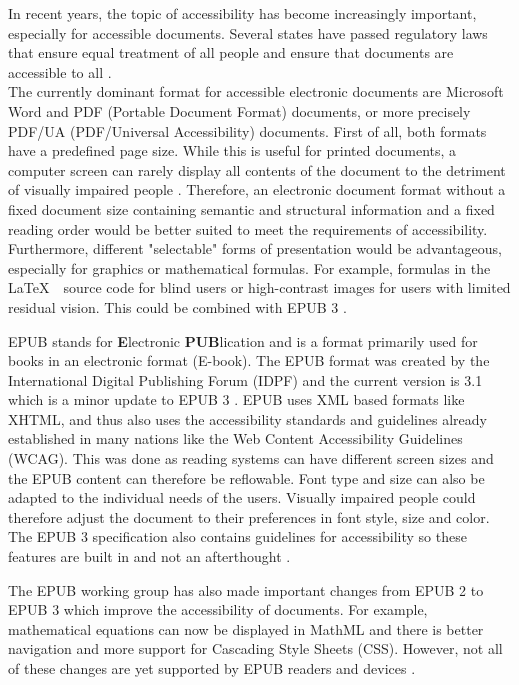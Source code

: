 In recent years, the topic of accessibility has become increasingly important, especially for accessible documents. Several states have passed regulatory laws that ensure equal treatment of all people and ensure that documents are accessible to all \cite{webaim}.\\
The currently dominant format for accessible electronic documents are Microsoft Word and PDF (Portable Document Format) documents, or more precisely PDF/UA (PDF/Universal Accessibility) documents. First of all, both formats have a predefined page size. While this is useful for printed documents, a computer screen can rarely display all contents of the document to the detriment of visually impaired people \cite{EPUBzone}. Therefore, an electronic document format without a fixed document size containing semantic and structural information and a fixed reading order would be better suited to meet the requirements of accessibility.\\
Furthermore, different "selectable" forms of presentation would be advantageous, especially for graphics or mathematical formulas. For example, formulas in the \LaTeX $\mbox{ }$ source code for blind users or high-contrast images for users with limited residual vision. This could be combined with EPUB 3 \cite{EPUBzone}.


EPUB stands for {\bf E}lectronic {\bf PUB}lication and is a format primarily used for books in an electronic format (E-book). The EPUB format was created by the International Digital Publishing Forum (IDPF) and the current version is 3.1 which is a minor update to EPUB 3 \cite{EPUBspecs}. EPUB uses XML based formats like XHTML, and thus also uses the accessibility standards and guidelines already established in many nations like the Web Content Accessibility Guidelines (WCAG)\cite{WCAG}. This was done as reading systems can have different screen sizes and the EPUB content can therefore be reflowable. Font type and size can also be adapted to the individual needs of the users. Visually impaired people could therefore adjust the document to their preferences in font style, size and color. The EPUB 3 specification also contains guidelines for accessibility so these features are built in and not an afterthought \cite{EPUB3bp}.

The EPUB working group has also made important changes from EPUB 2 to EPUB 3 which improve the accessibility of documents. For example, mathematical equations can now be displayed in MathML and there is better navigation and more support for Cascading Style Sheets (CSS). However, not all of these changes are yet supported by EPUB readers and devices \cite{EPUB30changes}. 

